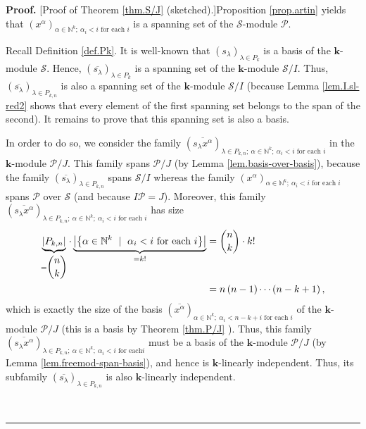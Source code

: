 \documentclass[numbers=enddot,12pt,final,onecolumn,notitlepage]{scrartcl}%
\theoremstyle{definition}
\newenvironment{proof}[1][Proof]{\noindent\textbf{#1.} }{\ \rule{0.5em}{0.5em}}
\begin{document}
\begin{proof}
[Proof of Theorem \ref{thm.S/J} (sketched).]Proposition \ref{prop.artin}
yields that $\left(  x^{\alpha}\right)  _{\alpha\in\mathbb{N}^{k};\ \alpha
_{i}<i\text{ for each }i}$ is a spanning set of the $\mathcal{S}$-module
$\mathcal{P}$.

Recall Definition \ref{def.Pk}. It is well-known that $\left(  s_{\lambda
}\right)  _{\lambda\in P_{k}}$ is a basis of the $\mathbf{k}$-module
$\mathcal{S}$. Hence, $\left(  \overline{s_{\lambda}}\right)  _{\lambda\in
P_{k}}$ is a spanning set of the $\mathbf{k}$-module $\mathcal{S}/I$. Thus,
$\left(  \overline{s_{\lambda}}\right)  _{\lambda\in P_{k,n}}$ is also a
spanning set of the $\mathbf{k}$-module $\mathcal{S}/I$ (because Lemma
\ref{lem.I.sl-red2} shows that every element of the first spanning set belongs
to the span of the second). It remains to prove that this spanning set is also
a basis.

In order to do so, we consider the family $\left(  \overline{s_{\lambda
}x^{\alpha}}\right)  _{\lambda\in P_{k,n};\ \alpha\in\mathbb{N}^{k}%
;\ \alpha_{i}<i\text{ for each }i}$ in the $\mathbf{k}$-module $\mathcal{P}%
/J$. This family spans $\mathcal{P}/J$ (by Lemma \ref{lem.basis-over-basis}),
because the family $\left(  \overline{s_{\lambda}}\right)  _{\lambda\in
P_{k,n}}$ spans $\mathcal{S}/I$ whereas the family $\left(  x^{\alpha}\right)
_{\alpha\in\mathbb{N}^{k};\ \alpha_{i}<i\text{ for each }i}$ spans
$\mathcal{P}$ over $\mathcal{S}$ (and because $I\mathcal{P}=J$). Moreover,
this family $\left(  \overline{s_{\lambda}x^{\alpha}}\right)  _{\lambda\in
P_{k,n};\ \alpha\in\mathbb{N}^{k};\ \alpha_{i}<i\text{ for each }i}$ has size
\begin{align*}
\underbrace{\left\vert P_{k,n}\right\vert }_{=\dbinom{n}{k}}\cdot
\underbrace{\left\vert \left\{  \alpha\in\mathbb{N}^{k}\ \mid\ \alpha
_{i}<i\text{ for each }i\right\}  \right\vert }_{=k!}  &  =\dbinom{n}{k}\cdot
k!\\
&  =n\left(  n-1\right)  \cdots\left(  n-k+1\right)  ,
\end{align*}
which is exactly the size of the basis $\left(  \overline{x^{\alpha}}\right)
_{\alpha\in\mathbb{N}^{k};\ \alpha_{i}<n-k+i\text{ for each }i}$ of the
$\mathbf{k}$-module $\mathcal{P}/J$ (this is a basis by Theorem \ref{thm.P/J}%
). Thus, this family $\left(  \overline{s_{\lambda}x^{\alpha}}\right)
_{\lambda\in P_{k,n};\ \alpha\in\mathbb{N}^{k};\ \alpha_{i}<i\text{ for each
}i}$ must be a basis of the $\mathbf{k}$-module $\mathcal{P}/J$ (by Lemma
\ref{lem.freemod-span-basis}), and hence is $\mathbf{k}$-linearly independent.
Thus, its subfamily $\left(  \overline{s_{\lambda}}\right)  _{\lambda\in
P_{k,n}}$ is also $\mathbf{k}$-linearly independent.


\end{proof}
\end{document}
